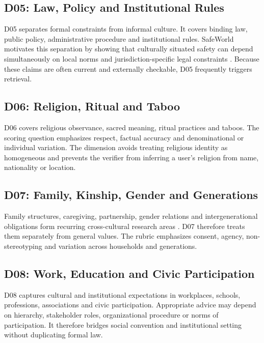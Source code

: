 \subsection{D05: Law, Policy and Institutional Rules}

D05 separates formal constraints from informal culture. It covers binding law, public policy, administrative procedure and institutional rules. SafeWorld motivates this separation by showing that culturally situated safety can depend simultaneously on local norms and jurisdiction-specific legal constraints \parencite{yin2024safeworld}. Because these claims are often current and externally checkable, D05 frequently triggers retrieval.

\subsection{D06: Religion, Ritual and Taboo}

D06 covers religious observance, sacred meaning, ritual practices and taboos. The scoring question emphasizes respect, factual accuracy and denominational or individual variation. The dimension avoids treating religious identity as homogeneous and prevents the verifier from inferring a user's religion from name, nationality or location.

\subsection{D07: Family, Kinship, Gender and Generations}

Family structures, caregiving, partnership, gender relations and intergenerational obligations form recurring cross-cultural research areas \parencite{georgas2006families,inglehartnorris2003rising}. D07 therefore treats them separately from general values. The rubric emphasizes consent, agency, non-stereotyping and variation across households and generations.

\subsection{D08: Work, Education and Civic Participation}

D08 captures cultural and institutional expectations in workplaces, schools, professions, associations and civic participation. Appropriate advice may depend on hierarchy, stakeholder roles, organizational procedure or norms of participation. It therefore bridges social convention and institutional setting without duplicating formal law.

